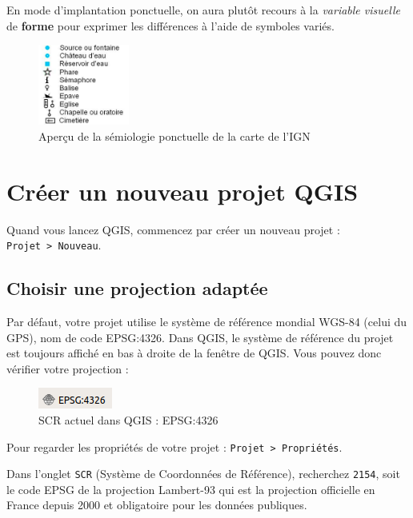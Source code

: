 En mode d'implantation ponctuelle, on aura plutôt recours à la
\emph{variable visuelle} de \textbf{forme} pour exprimer les différences
à l'aide de symboles variés.

\begin{figure}[htbp]
\centering
\includegraphics[height=1.04167in]{figures/examples_ponctuel_ign.png}
\caption{Aperçu de la sémiologie ponctuelle de la carte de l'IGN}
\end{figure}

\section{Créer un nouveau projet
QGIS}\label{cruxe9er-un-nouveau-projet-qgis}

Quand vous lancez QGIS, commencez par créer un nouveau projet :
\texttt{Projet\ \textgreater{}\ Nouveau}.

\subsection{Choisir une projection
adaptée}\label{choisir-une-projection-adaptuxe9e}

Par défaut, votre projet utilise le système de référence mondial WGS-84
(celui du GPS), nom de code EPSG:4326. Dans QGIS, le système de
référence du projet est toujours affiché en bas à droite de la fenêtre
de QGIS. Vous pouvez donc vérifier votre projection :

\begin{figure}[htbp]
\centering
\includegraphics{figures/EPSG4326.png}
\caption{SCR actuel dans QGIS : EPSG:4326}
\end{figure}

Pour regarder les propriétés de votre projet :
\texttt{Projet\ \textgreater{}\ Propriétés}.

Dans l'onglet \texttt{SCR} (Système de Coordonnées de Référence),
recherchez \texttt{2154}, soit le code EPSG de la projection Lambert-93
qui est la projection officielle en France depuis 2000 et obligatoire
pour les données publiques.


